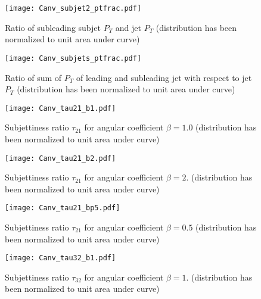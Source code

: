 \begin{figure}[H]
    \begin{center}
        \texttt{[image: Canv\_subjet2\_ptfrac.pdf]}
        \caption{Ratio of subleading subjet $P_{T}$ and jet $P_{T}$ (distribution has been normalized to unit area under curve)}
    \end{center}
\end{figure}
\begin{figure}[H]
    \begin{center}
        \texttt{[image: Canv\_subjets\_ptfrac.pdf]}
        \caption{Ratio of sum of $P_{T}$ of leading and subleading jet with respect to jet $P_{T}$ (distribution has been normalized to unit area under curve)}
    \end{center}
\end{figure}
\begin{figure}[H]
    \begin{center}
        \texttt{[image: Canv\_tau21\_b1.pdf]}
        \caption{Subjettiness ratio $\tau_{21}$ for angular coefficient $\beta=1.0$ (distribution has been normalized to unit area under curve)}
    \end{center}
\end{figure}
\begin{figure}[H]
    \begin{center}
        \texttt{[image: Canv\_tau21\_b2.pdf]}
        \caption{Subjettiness ratio $\tau_{21}$ for angular coefficient $\beta=2.$ (distribution has been normalized to unit area under curve)}
    \end{center}
\end{figure}
\begin{figure}[H]
    \begin{center}
        \texttt{[image: Canv\_tau21\_bp5.pdf]}
        \caption{Subjettiness ratio $\tau_{21}$ for angular coefficient $\beta=0.5$ (distribution has been normalized to unit area under curve)}
    \end{center}
\end{figure}
\begin{figure}[H]
    \begin{center}
        \texttt{[image: Canv\_tau32\_b1.pdf]}
        \caption{Subjettiness ratio $\tau_{32}$ for angular coefficient $\beta=1.$ (distribution has been normalized to unit area under curve)}
    \end{center}
\end{figure}
